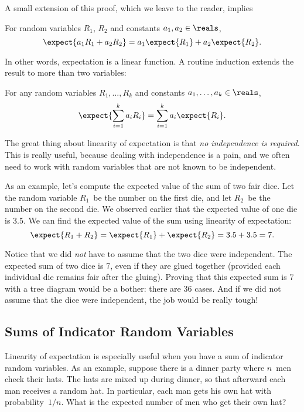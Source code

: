 A small extension of this proof, which we leave to the reader, implies
\begin{theorem}
For random variables $R_1$, $R_2$ and constants $a_1,a_2 \in \reals$,
\[
\expect{a_1R_1 + a_2R_2} = a_1\expect{R_1} + a_2\expect{R_2}.
\]
\end{theorem}
In other words, expectation is a linear function.  A routine induction
extends the result to more than two variables:
\begin{corollary}\label{linexp-k-thm}
For any random variables $R_1, \dots, R_k$ and constants $a_1, \dots, a_k
\in \reals$,
\[
    \expect{\sum_{i=1}^k a_iR_i} = \sum_{i=1}^k a_i\expect{R_i}.
\]
\end{corollary}

The great thing about linearity of expectation is that \emph{no
independence is required}.  This is really useful, because dealing with
independence is a pain, and we often need to work with random variables
that are not known to be independent.

As an example, let's compute the expected value of the sum of two fair
dice.  Let the random variable $R_1$~be the number on the first die,
and let $R_2$~be the number on the second die.  We observed earlier
that the expected value of one die is 3.5.  We can find the expected
value of the sum using linearity of expectation:
\begin{equation*}
\expect{R_1 + R_2}
 =   \expect{R_1} + \expect{R_2}
 =    3.5 + 3.5
 =    7.
\end{equation*}

Notice that we did \emph{not} have to assume that the two dice were
independent.  The expected sum of two dice is 7, even if they are
glued together (provided each individual die remains fair after the
gluing).  Proving that this expected sum is 7 with a tree diagram
would be a bother: there are 36 cases.  And if we did not assume that
the dice were independent, the job would be really tough!

\subsection{Sums of Indicator Random Variables}\label{sec:hat_check}

Linearity of expectation is especially useful when you have a sum of
indicator random variables.  As an example, suppose there is a dinner
party where $n$~men check their hats.  The hats are mixed up during
dinner, so that afterward each man receives a random hat.  In
particular, each man gets his own hat with probability~$1/n$.  What is
the expected number of men who get their own hat?

